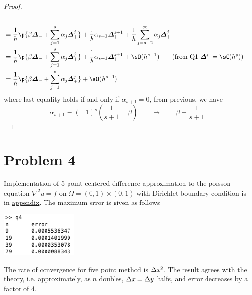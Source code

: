 \documentclass[11pt]{article}
\begin{document}
\begin{enumerate}
\begin{proof}
\begin{align*}
{                } \\
                &= \frac{1}{h} \p{
                    \beta \back + \sum_{j=1}^{s} \alpha_j \forw^j
                }
                + \frac{1}{h}\alpha_{s+1} \forw^{s+1}
                + \frac{1}{h}\sum_{j=s+2}^{\infty} \alpha_j \forw^j \\ 
                &= \frac{1}{h} \p{
                    \beta \back + \sum_{j=1}^{s} \alpha_j \forw^j
                }
                + \frac{1}{h}\alpha_{s+1} \forw^{s+1}
                + \sO(h^{s+1}) \tag{from Q1 $\forw^s = \sO(h^s)$} \\
                &= \frac{1}{h} \p{
                    \beta \back + \sum_{j=1}^{s} \alpha_j \forw^j
                }
                + \sO(h^{s+1})
        \end{align*}
        where last equality holds if and only if $\alpha_{s+1} = 0$, from previous, we have 
        \[
            \alpha_{s+1} = (-1)^{s} (\frac{1}{s+1} - \beta)
            \quad \quad \Rightarrow \quad \quad
            \beta = \frac{1}{s+1}
        \]
    \end{proof}
\end{enumerate}


\section*{Problem 4}
Implementation of 5-point centered difference approximation to the poisson equation $\nabla^2 u = f$ on $\Omega = (0,1)\times (0,1)$ with Dirichlet boundary condition is in \hyperref[q4code]{appendix}. The maximum error is given as follows
\begin{center}
    \includegraphics[width=1.5in]{p4output}
\end{center}
The rate of convergence for five point method is $\Delta x^2$. The result agrees with the theory, i.e. approximately, as $n$ doubles, $\Delta x=\Delta y$ halfs, and error decreases by a factor of 4.
\end{document}
